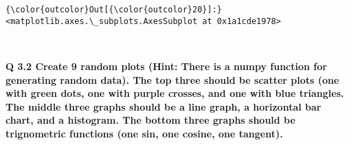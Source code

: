 \documentclass[11pt]{article}
\begin{document}
\begin{Verbatim}[commandchars=\\\{\}]
{\color{outcolor}Out[{\color{outcolor}20}]:} <matplotlib.axes.\_subplots.AxesSubplot at 0x1a1cde1978>
\end{Verbatim}
            
    \begin{center}
    \end{center}
    { \hspace*{\fill} \\}
    
    \textbf{Q 3.2 Create 9 random plots (Hint: There is a numpy function for
generating random data). The top three should be scatter plots (one with
green dots, one with purple crosses, and one with blue triangles. The
middle three graphs should be a line graph, a horizontal bar chart, and
a histogram. The bottom three graphs should be trignometric functions
(one sin, one cosine, one tangent).}
\end{document}
